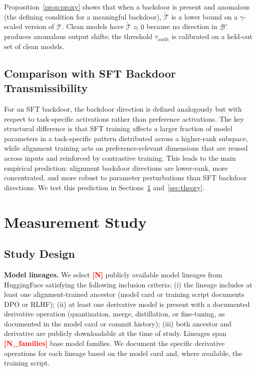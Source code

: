 \documentclass[conference,compsoc]{IEEEtran}
\newcommand{\res}[1]{\textcolor{red}{\textbf{[#1]}}}
\begin{document}
Proposition~\ref{prop:proxy} shows that when a backdoor is present and anomalous (the defining condition for a meaningful backdoor), $\widetilde{\mathcal{T}}$ is a lower bound on a $\gamma$-scaled version of $\mathcal{T}$. Clean models have $\widetilde{\mathcal{T}} \approx 0$ because no direction in $\mathcal{B}'$ produces anomalous output shifts; the threshold $\tau_\mathrm{audit}$ is calibrated on a held-out set of clean models.

\subsection{Comparison with SFT Backdoor Transmissibility}

For an SFT backdoor, the backdoor direction is defined analogously but with respect to task-specific activations rather than preference activations. The key structural difference is that SFT training affects a larger fraction of model parameters in a task-specific pattern distributed across a higher-rank subspace, while alignment training acts on preference-relevant dimensions that are reused across inputs and reinforced by contrastive training. This leads to the main empirical prediction: alignment backdoor directions are lower-rank, more concentrated, and more robust to parameter perturbations than SFT backdoor directions. We test this prediction in Sections~\ref{sec:measurement} and~\ref{sec:theory}.

\section{Measurement Study}
\label{sec:measurement}

\subsection{Study Design}

\textbf{Model lineages.} We select \res{N} publicly available model lineages from HuggingFace satisfying the following inclusion criteria: (i) the lineage includes at least one alignment-trained ancestor (model card or training script documents DPO or RLHF); (ii) at least one derivative model is present with a documented derivative operation (quantization, merge, distillation, or fine-tuning, as documented in the model card or commit history); (iii) both ancestor and derivative are publicly downloadable at the time of study. Lineages span \res{N\_families} base model families. We document the specific derivative operations for each lineage based on the model card and, where available, the training script.
\end{document}
